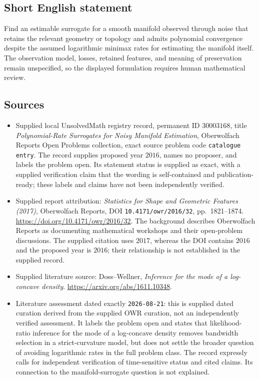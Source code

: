 \documentclass[11pt]{article}
\begin{document}
\subsection{Short English statement}
Find an estimable surrogate for a smooth manifold observed through noise that retains the relevant geometry or topology and admits polynomial convergence despite the assumed logarithmic minimax rates for estimating the manifold itself. The observation model, losses, retained features, and meaning of preservation remain unspecified, so the displayed formulation requires human mathematical review.
\subsection{Sources}
\begin{itemize}
\item Supplied local UnsolvedMath registry record, permanent ID \(30003168\), title \emph{Polynomial-Rate Surrogates for Noisy Manifold Estimation}, Oberwolfach Reports Open Problems collection, exact source problem code \texttt{catalogue entry}. The record supplies proposed year \(2016\), names no proposer, and labels the problem open. Its statement status is supplied as exact, with a supplied verification claim that the wording is self-contained and publication-ready; these labels and claims have not been independently verified.
\item Supplied report attribution: \emph{Statistics for Shape and Geometric Features (2017)}, Oberwolfach Reports, DOI \texttt{10.4171/owr/2016/32}, pp.\ 1821--1874. \url{https://doi.org/10.4171/owr/2016/32}. The background describes Oberwolfach Reports as documenting mathematical workshops and their open-problem discussions. The supplied citation uses \(2017\), whereas the DOI contains \(2016\) and the proposed year is \(2016\); their relationship is not established in the supplied record.
\item Supplied literature source: Doss--Wellner, \emph{Inference for the mode of a log-concave density}. \url{https://arxiv.org/abs/1611.10348}.
\item Literature assessment dated exactly \texttt{2026-08-21}: this is supplied dated curation derived from the supplied OWR curation, not an independently verified assessment. It labels the problem open and states that likelihood-ratio inference for the mode of a log-concave density removes bandwidth selection in a strict-curvature model, but does not settle the broader question of avoiding logarithmic rates in the full problem class. The record expressly calls for independent verification of time-sensitive status and cited claims. Its connection to the manifold-surrogate question is not explained.
\end{itemize}
\end{document}

